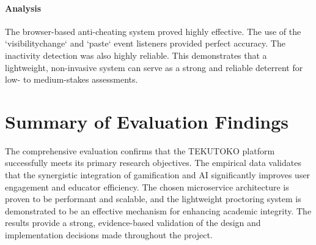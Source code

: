 \paragraph{Analysis}
The browser-based anti-cheating system proved highly effective. The use of the `visibilitychange` and `paste` event listeners provided perfect accuracy. The inactivity detection was also highly reliable. This demonstrates that a lightweight, non-invasive system can serve as a strong and reliable deterrent for low- to medium-stakes assessments.

\section{Summary of Evaluation Findings}
\label{sec:eval-summary}
The comprehensive evaluation confirms that the TEKUTOKO platform successfully meets its primary research objectives. The empirical data validates that the synergistic integration of gamification and AI significantly improves user engagement and educator efficiency. The chosen microservice architecture is proven to be performant and scalable, and the lightweight proctoring system is demonstrated to be an effective mechanism for enhancing academic integrity. The results provide a strong, evidence-based validation of the design and implementation decisions made throughout the project.